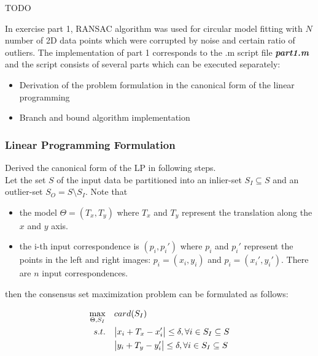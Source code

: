 \documentclass[paper=a4, fontsize=11pt]{scrartcl} %
\numberwithin{equation}{section} %
\numberwithin{figure}{section} %
\numberwithin{table}{section} %
\newcommand{\filename}[1]{\textbf{\textit{#1}}}
\begin{document}
TODO 

In exercise part 1, RANSAC algorithm was used for circular model fitting with $N$ number of 2D data points which were corrupted by noise and certain ratio of outliers. The implementation of part 1 corresponds to the .m script file \filename{part1.m} and the script consists of several parts which can be executed separately: 

\begin{itemize}
\item Derivation of the problem formulation in the canonical form of the linear programming
\item Branch and bound algorithm implementation
\end{itemize}  

\subsubsection{Linear Programming Formulation}

Derived the canonical form of the LP in following steps. \\

Let the set $S$ of the input data be partitioned into an inlier-set $S_{I} \subseteq S$ and an outlier-set $S_{O} = S \setminus S_{I}$. Note that  

\begin{itemize}
\item the model $\Theta = (T_{x}, T_{y})$ where $T_{x}$ and $T_{y}$ represent the translation along the $x$ and $y$ axis.
\item the i-th input correspondence is $(p_{i}, p_{i}')$ where $p_{i}$ and $p_{i}'$ represent the points in the left and right images: $p_{i} = (x_{i}, y_{i})$ and $p_{i} = (x_{i}', y_{i}')$. There are $n$ input correspondences.
\end{itemize}

then the consensus set maximization problem can be formulated as follows: 

\begin{equation}
\begin{split}
\max_{\Theta, S_{I}} &\quad card(S_{I}) \\
s.t. 	&\quad \abs{x_{i} + T_{x} - x_{i}'} \leq \delta, \forall i \in S_{I} \subseteq S \\
	&\quad \abs{y_{i} + T_{y} - y_{i}'} \leq \delta, \forall i \in S_{I} \subseteq S
\end{split}
\end{equation}
\end{document}
